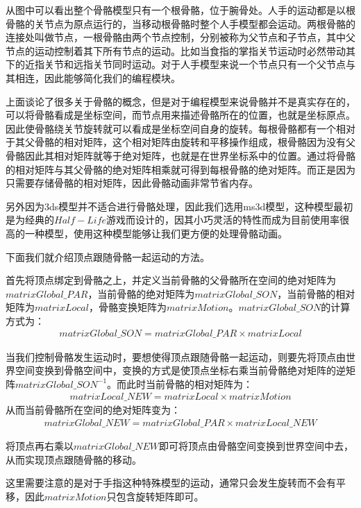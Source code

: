 从图中可以看出整个骨骼模型只有一个根骨骼，位于腕骨处。人手的运动都是以根骨骼的关节点为原点运行的，当移动根骨骼时整个人手模型都会运动。两根骨骼的连接处叫做节点，一根骨骼由两个节点控制，分别被称为父节点和子节点，其中父节点的运动控制着其下所有节点的运动。比如当食指的掌指关节运动时必然带动其下的近指关节和远指关节同时运动。对于人手模型来说一个节点只有一个父节点与其相连，因此能够简化我们的编程模块。

上面谈论了很多关于骨骼的概念，但是对于编程模型来说骨骼并不是真实存在的，可以将骨骼看成是坐标空间，而节点用来描述骨骼所在的位置，也就是坐标原点。因此使骨骼绕关节旋转就可以看成是坐标空间自身的旋转。每根骨骼都有一个相对于其父骨骼的相对矩阵，这个相对矩阵由旋转和平移操作组成，根骨骼因为没有父骨骼因此其相对矩阵就等于绝对矩阵，也就是在世界坐标系中的位置。通过将骨骼的相对矩阵与其父骨骼的绝对矩阵相乘就可得到每根骨骼的绝对矩阵。而正是因为只需要存储骨骼的相对矩阵，因此骨骼动画非常节省内存。

另外因为3ds模型并不适合进行骨骼处理，因此我们选用ms3d模型，这种模型最初是为经典的$Half-Life$游戏而设计的，因其小巧灵活的特性而成为目前使用率很高的一种模型，使用这种模型能够让我们更方便的处理骨骼动画。

下面我们就介绍顶点跟随骨骼一起运动的方法。

首先将顶点绑定到骨骼之上，并定义当前骨骼的父骨骼所在空间的绝对矩阵为$matrixGlobal\_PAR$，当前骨骼的绝对矩阵为$matrixGlobal\_SON$，当前骨骼的相对矩阵为$matrixLocal$，骨骼变换矩阵为$matrixMotion$。$matrixGlobal\_SON$的计算方式为：
\begin{eqnarray}
  matrixGlobal\_SON=matrixGlobal\_PAR\times matrixLocal
\end{eqnarray}

当我们控制骨骼发生运动时，要想使得顶点跟随骨骼一起运动，则要先将顶点由世界空间变换到骨骼空间中，变换的方式是使顶点坐标右乘当前骨骼绝对矩阵的逆矩阵$matrixGlobal\_SON^{-1}$。而此时当前骨骼的相对矩阵为：
\begin{eqnarray}
  matrixLocal\_NEW=matrixLocal\times matrixMotion
\end{eqnarray}
从而当前骨骼所在空间的绝对矩阵变为：
\begin{eqnarray}
  matrixGlobal\_NEW=matrixGlobal\_PAR\times matrixLocal\_NEW
\end{eqnarray}

将顶点再右乘以$matrixGlobal\_NEW$即可将顶点由骨骼空间变换到世界空间中去，从而实现顶点跟随骨骼的移动。

这里需要注意的是对于手指这种特殊模型的运动，通常只会发生旋转而不会有平移，因此$matrixMotion$只包含旋转矩阵即可。


